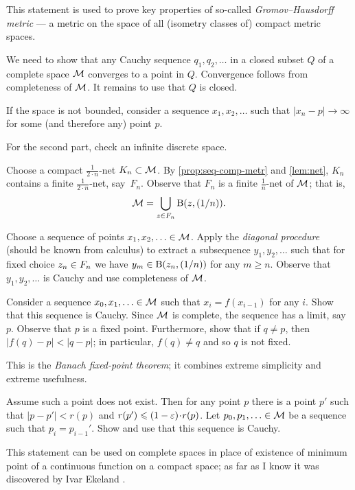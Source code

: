 This statement is used to prove key properties of so-called \emph{Gromov--Hausdorff metric} --- a metric on the space of all (isometry classes of) compact metric spaces.

We need to show that any Cauchy sequence $q_1,q_2,\ldots$ in a closed subset $Q$ of a complete space $\mathcal{M}$ converges to a point in $Q$.
Convergence follows from completeness of $\mathcal{M}$.
It remains to use that $Q$ is closed.

If the space is not bounded, consider a sequence $x_1,x_2,\ldots$ such that $|x_n-p|\to\infty$ for some (and therefore any) point $p$.

For the second part, check an infinite discrete space.

Choose a compact $\tfrac1{2\cdot n}$-net $K_n\subset \mathcal{M}$.
By \ref{prop:seq-comp-metr} and \ref{lem:net}, $K_n$ contains a finite $\tfrac1{2\cdot n}$-net, say~$F_n$.
Observe that $F_n$ is a finite $\tfrac1n$-net of $\mathcal{M}$;
that is,
\[\mathcal{M}=\bigcup_{z\in F_n} \mathrm{B}(z,(1/n)).\]

Choose a sequence of points $x_1,x_2,\z\ldots\in\c{M}$.
Apply the \emph{diagonal procedure} (should be known from calculus) to extract a subsequence $y_1,y_2,\ldots$ such that for fixed choice $z_n\z\in F_n$ we have
$y_m\in \mathrm{B}(z_n,(1/n))$ for any $m\ge n$.
Observe that $y_1,y_2,\ldots$ is Cauchy and use completeness of $\mathcal{M}$.

Consider a sequence $x_0,x_1,\ldots\in\mathcal{M}$ such that $x_{i}=f(x_{i-1})$ for any $i$.
Show that this sequence is Cauchy.
Since $\mathcal{M}$ is complete, the sequence has a limit, say $p$.
Observe that $p$ is a fixed point.
Furthermore, show that if $q\ne p$, then $|f(q)-p|<|q-p|$;
in particular, $f(q)\ne q$ and so $q$ is not fixed.

This is the \emph{Banach fixed-point theorem}; it combines extreme simplicity and extreme usefulness.

Assume such a point does not exist.
Then for any point $p$ there is a point $p'$ such that $|p-p'|<r(p)$ and $r(p')\le (1-\eps)\cdot r(p)$.
Let $p_0,p_1,\ldots \in\mathcal{M}$ be a sequence such that $p_i=p_{i-1}'$.
Show and use that this sequence is Cauchy.

This statement can be used on complete spaces in place of existence of minimum point of a continuous function on a compact space; as far as I know it was discovered by Ivar Ekeland \cite{ekeland}.



